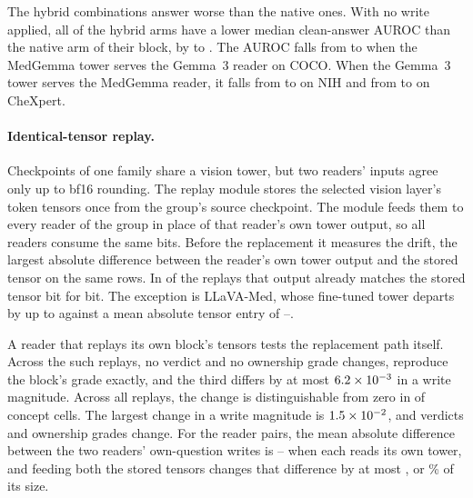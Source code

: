 \documentclass[11pt]{article}
\begin{document}
The hybrid combinations answer worse than the native ones. With no write applied, all \cfSwapAnsWorse{} of the \cfSwapAnsArms{} hybrid arms have a lower median clean-answer AUROC than the native arm of their block, by \cfSwapAnsDropMin{} to \cfSwapAnsDropMax{}. The AUROC falls from \cfSwapAnsNativeGemCoco{} to \cfSwapAnsHybridGemCoco{} when the MedGemma tower serves the Gemma~3 reader on COCO. When the Gemma~3 tower serves the MedGemma reader, it falls from \cfSwapAnsNativeMedNih{} to \cfSwapAnsHybridMedNih{} on NIH and from \cfSwapAnsNativeMedChex{} to \cfSwapAnsHybridMedChex{} on CheXpert.

\paragraph{Identical-tensor replay.} Checkpoints of one family share a vision tower, but two readers' inputs agree only up to bf16 rounding. The replay module stores the selected vision layer's token tensors once from the group's source checkpoint. The module feeds them to every reader of the group in place of that reader's own tower output, so all readers consume the same bits. Before the replacement it measures the drift, the largest absolute difference between the reader's own tower output and the stored tensor on the same rows. In \cfReplayDriftZero{} of the \cfReplayBlocks{} replays that output already matches the stored tensor bit for bit. The exception is LLaVA-Med, whose fine-tuned tower departs by up to \cfReplayDriftMax{} against a mean absolute tensor entry of \cfReplayTensorMin{}--\cfReplayTensorMax{}.

A reader that replays its own block's tensors tests the replacement path itself. Across the \cfReplaySelf{} such replays, no verdict and no ownership grade changes, \cfReplaySelfExact{} reproduce the block's grade exactly, and the third differs by at most $6.2\times10^{-3}$ in a write magnitude. Across all \cfReplayBlocks{} replays, the change is distinguishable from zero in \cfReplayMoved{} of \cfReplayCells{} concept cells. The largest change in a write magnitude is $1.5\times10^{-2}$, and \cfReplayVerdictChanges{} verdicts and \cfReplayOwnedChanges{} ownership grades change. For the \cfReplayPairs{} reader pairs, the mean absolute difference between the two readers' own-question writes is \cfReplayPairOwnMin{}--\cfReplayPairOwnMax{} when each reads its own tower, and feeding both the stored tensors changes that difference by at most \cfReplayChangeMax{}, or \cfReplayRelMax\% of its size.
\end{document}
